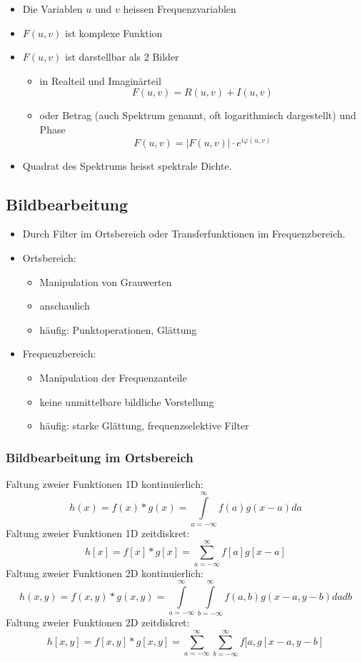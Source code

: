 \begin{itemize}
\item Die Variablen $u$ und $v$ heissen Frequenzvariablen
\item $F(u,v)$ ist komplexe Funktion
\item $F(u,v)$ ist darstellbar als 2 Bilder
\begin{itemize}
\item in Realteil und Imaginärteil $$F(u,v) = R(u,v) + I(u,v)$$
\item oder Betrag (auch Spektrum genannt, oft logarithmisch dargestellt) und Phase $$F(u,v) = |F(u,v)| \cdot e^{i \varphi (u,v)}$$
\end{itemize}
\item Quadrat des Spektrums heisst spektrale Dichte.
\end{itemize}

\subsection{Bildbearbeitung}

\begin{itemize}
\item Durch Filter im Ortsbereich oder Transferfunktionen im Frequenzbereich.
\item Ortsbereich:
\begin{itemize}
\item Manipulation von Grauwerten
\item anschaulich
\item häufig: Punktoperationen, Glättung
\end{itemize}
\item Frequenzbereich:
\begin{itemize}
\item Manipulation der Frequenzanteile
\item keine unmittelbare bildliche Vorstellung
\item häufig: starke Glättung, frequenzselektive Filter
\end{itemize}
\end{itemize}

\subsubsection*{Bildbearbeitung im Ortsbereich}

Faltung zweier Funktionen 1D kontinuierlich: $$h(x) = f(x) * g(x) = \int\limits_{a = - \infty}^{\infty} f(a) g(x-a) da$$
Faltung zweier Funktionen 1D zeitdiskret: $$h[x] = f[x] * g[x] = \sum\limits_{a = - \infty}^{\infty} f[a] g[x-a]$$
Faltung zweier Funktionen 2D kontinuierlich: $$h(x,y) = f(x,y) * g(x,y) = \int\limits_{a = -\infty}^{\infty} \int\limits_{b = -\infty}^{\infty} f(a,b) g(x-a,y-b) dadb$$
Faltung zweier Funktionen 2D zeitdiskret: $$h[x,y] = f[x,y] * g[x,y] = \sum\limits_{a = -\infty}^{\infty} \sum\limits_{b = -\infty}^{\infty} f[a, g[x-a,y-b]$$

